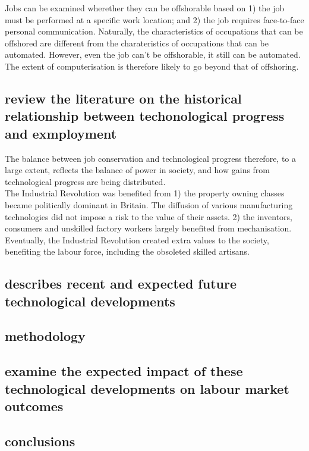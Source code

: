 \documentclass[11pt]{article}
\begin{document}
   Jobs can be examined wherether they can be offshorable based on 1) the job must be performed at a specific work location; and 2) the job requires face-to-face personal communication. Naturally, the characteristics of occupations that can be offshored are different from the charateristics of occupations that can be automated. However, even the job can't be offshorable, it still can be automated. The extent of computerisation is therefore likely to go beyond that of offshoring.\\

   \subsection{review the literature on the historical relationship between techonological progress and exmployment}

   The balance between job conservation and technological progress therefore, to a large extent, reflects the balance of power in society, and how gains from technological progress are being distributed.\\

   The Industrial Revolution was benefited from 1) the property owning classes became politically dominant in Britain. The diffusion of various manufacturing technologies did not impose a risk to the value of their assets. 2) the inventors, consumers and unskilled factory workers largely benefited from mechanisation.\\

   Eventually, the Industrial Revolution created extra values to the society, benefiting the labour force, including the obsoleted skilled artisans.\\

   

   \subsection{describes recent and expected future technological developments}

   \subsection{methodology}

   \subsection{examine the expected impact of these technological developments on labour market outcomes}

   \subsection{conclusions}



   
\end{document}
